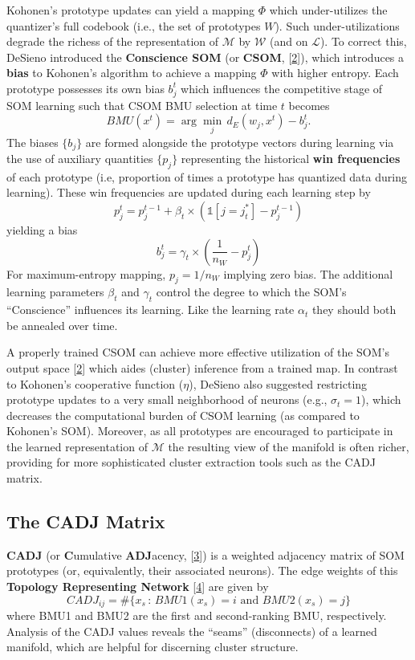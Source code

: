 \documentclass[]{article}
\begin{document}
Kohonen's prototype updates can yield a mapping \(\Phi\) which under-utilizes the quantizer's full codebook (i.e., the set of prototypes \(W\)). Such under-utilizations degrade the richess of the representation of \(\mathcal{M}\) by \(\mathcal{W}\) (and on \(\mathcal{L}\)). To correct this, DeSieno introduced the \textbf{Conscience SOM} (or \textbf{CSOM}, {[}\protect\hyperlink{ref-DeSieno1988}{2}{]}), which introduces a \textbf{bias} to Kohonen's algorithm to achieve a mapping \(\Phi\) with higher entropy. Each prototype possesses its own bias \(b_j^t\) which influences the competitive stage of SOM learning such that CSOM BMU selection at time \(t\) becomes
\[ BMU(x^t) = \arg\min_j \, d_E(w_j, x^t) - b_j^t.\]
The biases \(\{b_j\}\) are formed alongside the prototype vectors during learning via the use of auxiliary quantities \(\{p_j\}\) representing the historical \textbf{win frequencies} of each prototype (i.e, proportion of times a prototype has quantized data during learning). These win frequencies are updated during each learning step by
\[ p_j^t = p_j^{t-1} + \beta_t \times (\mathbb{1}[j = j^*_t] - p_j^{t-1}) \]
yielding a bias
\[ b_j^t = \gamma_t \times \left( \frac{1}{n_W} - p_j^t \right) \]
For maximum-entropy mapping, \(p_j = 1 / n_W\) implying zero bias. The additional learning parameters \(\beta_t\) and \(\gamma_t\) control the degree to which the SOM's ``Conscience'' influences its learning. Like the learning rate \(\alpha_t\) they should both be annealed over time.

A properly trained CSOM can achieve more effective utilization of the SOM's output space {[}\protect\hyperlink{ref-DeSieno1988}{2}{]} which aides (cluster) inference from a trained map. In contrast to Kohonen's cooperative function (\(\eta\)), DeSieno also suggested restricting prototype updates to a very small neighborhood of neurons (e.g., \(\sigma_t = 1\)), which decreases the computational burden of CSOM learning (as compared to Kohonen's SOM). Moreover, as all prototypes are encouraged to participate in the learned representation of \(\mathcal{M}\) the resulting view of the manifold is often richer, providing for more sophisticated cluster extraction tools such as the CADJ matrix.

\hypertarget{the-cadj-matrix}{%
\subsection{The CADJ Matrix}\label{the-cadj-matrix}}

\textbf{CADJ} (or \textbf{C}umulative \textbf{ADJ}acency, {[}\protect\hyperlink{ref-TasdemirMerenyi2009}{3}{]}) is a weighted adjacency matrix of SOM prototypes (or, equivalently, their associated neurons). The edge weights of this \textbf{Topology Representing Network} {[}\protect\hyperlink{ref-MartinetzSchulten1994}{4}{]} are given by
\[ CADJ_{ij} = \# \{x_s \, : \, BMU1(x_s) = i \text{ and } BMU2(x_s) = j \} \]
where BMU1 and BMU2 are the first and second-ranking BMU, respectively. Analysis of the CADJ values reveals the ``seams'' (disconnects) of a learned manifold, which are helpful for discerning cluster structure.
\end{document}
